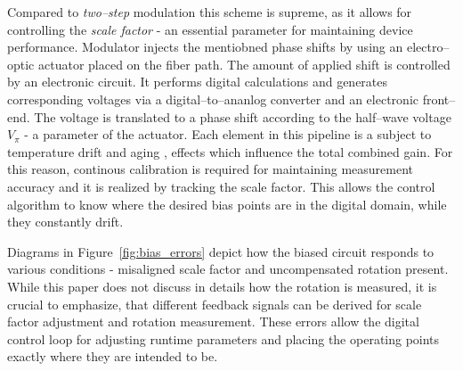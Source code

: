 \documentclass{article}
\begin{document}
Compared to \textit{two--step} modulation
this scheme is supreme, as it allows for controlling the \textit{scale factor} - an essential parameter for maintaining device performance. Modulator injects the mentiobned phase shifts by using an electro--optic actuator placed on the fiber path. The amount of applied shift is controlled by an electronic circuit. It performs digital calculations and generates corresponding voltages via a digital--to--ananlog converter and an electronic front--end. The voltage is translated to a phase shift according to the half--wave voltage $V_\pi$ - a parameter of the actuator. Each element in this pipeline is a subject to temperature drift and aging
, effects which influence the total combined gain. For this reason, continous calibration is required for maintaining measurement accuracy and it is realized by tracking the scale factor. This allows the control algorithm to know where the desired bias points are in the digital domain, while they constantly drift.

Diagrams in Figure~\ref{fig:bias_errors} depict how the biased circuit responds to various conditions - misaligned scale factor and uncompensated rotation present. While this paper does not discuss in details how the rotation is measured, it is crucial to emphasize, that different feedback signals can be derived for scale factor adjustment and rotation measurement. These errors allow the digital control loop for adjusting runtime parameters and placing the operating points exactly where they are intended to be.
\end{document}

